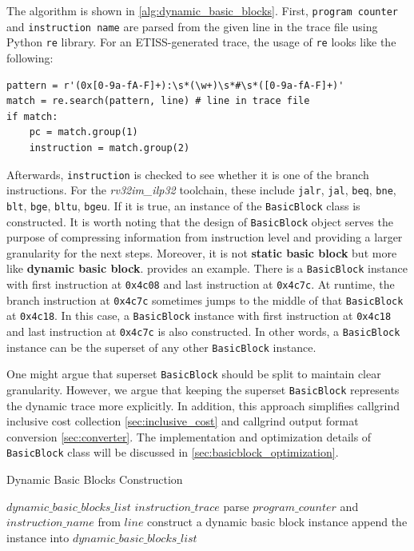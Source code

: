 The algorithm is shown in \cref{alg:dynamic_basic_blocks}. First, \texttt{program counter} and \texttt{instruction name} are parsed from the given line in the trace file using Python \texttt{re} library. For an ETISS-generated trace, the usage of \texttt{re} looks like the following:

\medskip
\begin{lstlisting}
pattern = r'(0x[0-9a-fA-F]+):\s*(\w+)\s*#\s*([0-9a-fA-F]+)'
match = re.search(pattern, line) # line in trace file
if match:
    pc = match.group(1)
    instruction = match.group(2)
\end{lstlisting}
\medskip

Afterwards, \texttt{instruction} is checked to see whether it is one of the branch instructions. For the \textit{rv32im\_ilp32} toolchain, these include \texttt{jalr}, \texttt{jal}, \texttt{beq}, \texttt{bne}, \texttt{blt}, \texttt{bge}, \texttt{bltu}, \texttt{bgeu}. If it is true, an instance of the \texttt{BasicBlock} class is constructed. It is worth noting that the design of  \texttt{BasicBlock} object serves the purpose of compressing information from instruction level and providing a larger granularity for the next steps. Moreover, it is not \textbf{static basic block} but more like \textbf{dynamic basic block}.  provides an example. There is a \texttt{BasicBlock} instance with first instruction at \texttt{0x4c08} and last instruction at \texttt{0x4c7c}. At runtime, the branch instruction at \texttt{0x4c7c} sometimes jumps to the middle of that \texttt{BasicBlock} at \texttt{0x4c18}. In this case, a \texttt{BasicBlock} instance with first instruction at \texttt{0x4c18} and last instruction at \texttt{0x4c7c} is also constructed. In other words, a \texttt{BasicBlock} instance can be the superset of any other \texttt{BasicBlock} instance.

One might argue that superset \texttt{BasicBlock} should be split to maintain clear granularity. However, we argue that keeping the superset \texttt{BasicBlock} represents the dynamic trace more explicitly. In addition, this approach simplifies callgrind inclusive cost collection \cref{sec:inclusive_cost} and callgrind output format conversion \cref{sec:converter}. The implementation and optimization details of \texttt{BasicBlock} class will be discussed in \cref{sec:basicblock_optimization}. 

\medskip
\begin{algorithm}
\caption{Dynamic Basic Blocks Construction}
\label{alg:dynamic_basic_blocks}
\begin{algorithmic}
\REQUIRE $dynamic\_basic\_blocks\_list$
\REQUIRE $instruction\_trace$
    \STATE parse $program\_counter$ and $instruction\_name$ from $line$ 
        \STATE construct a dynamic basic block instance
        \STATE append the instance into $dynamic\_basic\_blocks\_list$
    \ENDIF
\ENDFOR
\end{algorithmic}
\end{algorithm}
\medskip

